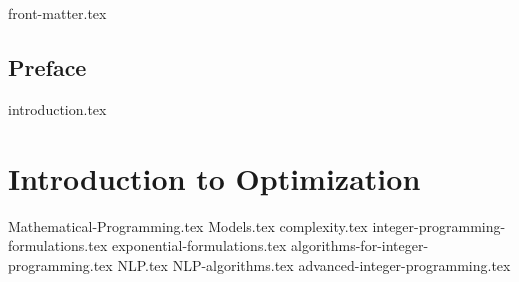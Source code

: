 \documentclass[letter,11pt]{book}
\begin{document}
 
  
{front-matter.tex}
\tableofcontents

\chapter{Preface}
{introduction.tex}

\part{Introduction to Optimization}
{Mathematical-Programming.tex}
{Models.tex}
{complexity.tex}
{integer-programming-formulations.tex}
{exponential-formulations.tex}
{algorithms-for-integer-programming.tex}
{NLP.tex}
{NLP-algorithms.tex}
{advanced-integer-programming.tex}

\ifx\footfullcite\undefined  %
  
  
\else                        %
  \printbibliography
\fi
\end{document}
